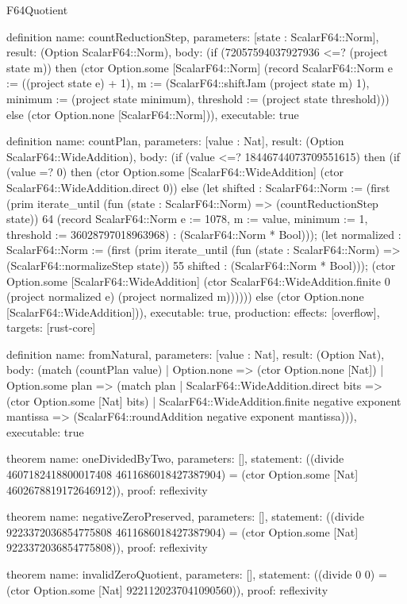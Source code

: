\begin{lexlean}{F64Quotient}
\begin{semanticmodule}
definition{
  name: countReductionStep,
  parameters: [state : ScalarF64::Norm],
  result: (Option ScalarF64::Norm),
  body: (if (72057594037927936 <=? (project state m)) then (ctor Option.some [ScalarF64::Norm] (record ScalarF64::Norm {e := ((project state e) + 1), m := (ScalarF64::shiftJam (project state m) 1), minimum := (project state minimum), threshold := (project state threshold)})) else (ctor Option.none [ScalarF64::Norm])),
  executable: true
}

definition{
  name: countPlan,
  parameters: [value : Nat],
  result: (Option ScalarF64::WideAddition),
  body: (if (value <=? 18446744073709551615) then (if (value =? 0) then (ctor Option.some [ScalarF64::WideAddition] (ctor ScalarF64::WideAddition.direct 0)) else (let shifted : ScalarF64::Norm := (first (prim iterate_until (fun (state : ScalarF64::Norm) => (countReductionStep state)) 64 (record ScalarF64::Norm {e := 1078, m := value, minimum := 1, threshold := 36028797018963968}) : (ScalarF64::Norm * Bool))); (let normalized : ScalarF64::Norm := (first (prim iterate_until (fun (state : ScalarF64::Norm) => (ScalarF64::normalizeStep state)) 55 shifted : (ScalarF64::Norm * Bool))); (ctor Option.some [ScalarF64::WideAddition] (ctor ScalarF64::WideAddition.finite 0 (project normalized e) (project normalized m)))))) else (ctor Option.none [ScalarF64::WideAddition])),
  executable: true,
  production: {effects: [overflow], targets: [rust-core]}
}

definition{
  name: fromNatural,
  parameters: [value : Nat],
  result: (Option Nat),
  body: (match (countPlan value)
    | Option.none => (ctor Option.none [Nat])
    | Option.some plan => (match plan
      | ScalarF64::WideAddition.direct bits => (ctor Option.some [Nat] bits)
      | ScalarF64::WideAddition.finite negative exponent mantissa => (ScalarF64::roundAddition negative exponent mantissa))),
  executable: true
}

theorem{
  name: oneDividedByTwo,
  parameters: [],
  statement: ((divide 4607182418800017408 4611686018427387904) = (ctor Option.some [Nat] 4602678819172646912)),
  proof: reflexivity{}
}

theorem{
  name: negativeZeroPreserved,
  parameters: [],
  statement: ((divide 9223372036854775808 4611686018427387904) = (ctor Option.some [Nat] 9223372036854775808)),
  proof: reflexivity{}
}

theorem{
  name: invalidZeroQuotient,
  parameters: [],
  statement: ((divide 0 0) = (ctor Option.some [Nat] 9221120237041090560)),
  proof: reflexivity{}
}


\end{semanticmodule}
\end{lexlean}
